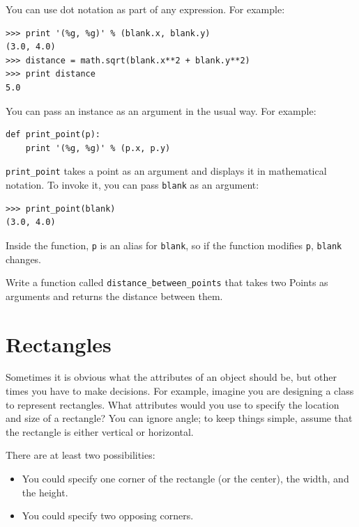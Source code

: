 \documentclass[10pt]{book}
\begin{document}
You can use dot notation as part of any expression.  For example:

\begin{verbatim}
>>> print '(%g, %g)' % (blank.x, blank.y)
(3.0, 4.0)
>>> distance = math.sqrt(blank.x**2 + blank.y**2)
>>> print distance
5.0
\end{verbatim}
%
You can pass an instance as an argument in the usual way.
For example:

\begin{verbatim}
def print_point(p):
    print '(%g, %g)' % (p.x, p.y)
\end{verbatim}
%
\verb"print_point" takes a point as an argument and displays it in
mathematical notation.  To invoke it, you can pass {\tt blank} as
an argument:

\begin{verbatim}
>>> print_point(blank)
(3.0, 4.0)
\end{verbatim}
%
Inside the function, {\tt p} is an alias for {\tt blank}, so if
the function modifies {\tt p}, {\tt blank} changes.


\begin{exercise}

Write a function called \verb"distance_between_points" that takes two
Points as arguments and returns the distance between them.

\end{exercise}



\section{Rectangles}
\label{rectangles}

Sometimes it is obvious what the attributes of an object should be,
but other times you have to make decisions.  For example, imagine you
are designing a class to represent rectangles.  What attributes would
you use to specify the location and size of a rectangle?  You can
ignore angle; to keep things simple, assume that the rectangle is
either vertical or horizontal.

There are at least two possibilities:

\begin{itemize}

\item You could specify one corner of the rectangle
(or the center), the width, and the height.

\item You could specify two opposing corners.

\end{itemize}
\end{document}

